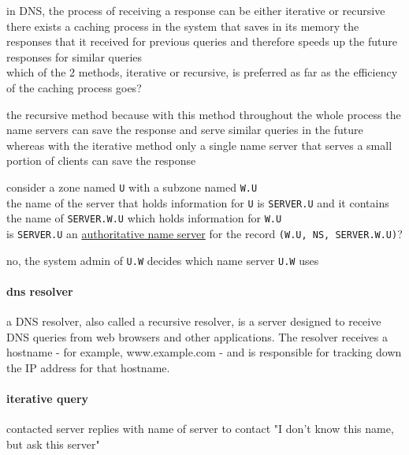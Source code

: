 \documentclass[a4paper,12pt]{article}
\begin{document}
\begin{question}
in DNS, the process of receiving a response can be either iterative or recursive\\
there exists a caching process in the system that saves in its memory the responses that it received for previous queries and therefore speeds up the future responses for similar queries\\
which of the 2 methods, iterative or recursive, is preferred as far as the efficiency of the caching process goes?\\
\begin{answer}
the recursive method because with this method throughout the whole process the name servers can save the response and serve similar queries in the future whereas with the iterative method only a single name server that serves a small portion of clients can save the response\\
\end{answer}
\end{question}
\begin{question}
consider a zone named \texttt{U} with a subzone named \texttt{W.U}\\
the name of the server that holds information for \texttt{U} is \texttt{SERVER.U} and it contains the name of \texttt{SERVER.W.U} which holds information for \texttt{W.U}\\
is \texttt{SERVER.U} an \hyperref[sec:orgdf2cbbe]{authoritative name server} for the record \texttt{(W.U, NS, SERVER.W.U)}?\\
\begin{answer}
no, the system admin of \texttt{U.W} decides which name server \texttt{U.W} uses\\
\end{answer}
\end{question}
\paragraph{dns resolver}
\label{sec:org5302061}
a DNS resolver, also called a recursive resolver, is a server designed to receive DNS queries from web browsers and other applications. The resolver receives a hostname - for example, www.example.com - and is responsible for tracking down the IP address for that hostname.\\
\paragraph{iterative query}
\label{sec:org52d8a96}
contacted server replies with name of server to contact "I don’t know this name, but ask this server"\\
\end{document}
